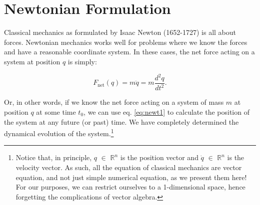 \documentclass[
  9pt,
]{extbook}
\theoremstyle{definition}
\theoremstyle{definition}
\theoremstyle{definition}
\theoremstyle{remark}
\begin{document}
\hypertarget{newtonian-formulation}{%
\section{Newtonian Formulation}\label{newtonian-formulation}}

Classical mechanics as formulated by Isaac Newton (1652-1727) is all about forces. Newtonian mechanics works well for problems where we know the forces and have a reasonable coordinate system. In these cases, the net force acting on a system at position \(q\) is simply:

\begin{equation}
F_{\mathrm{net}}(q) = m\ddot{q} = m \frac{d^2 q}{dt^2}.
\label{eq:newt1}
\end{equation}

Or, in other words, if we know the net force acting on a system of mass \(m\) at position \(q\) at some time \(t_0\), we can use eq. \eqref{eq:newt1} to calculate the position of the system at any future (or past) time. We have completely determined the dynamical evolution of the system.\footnote{Notice that, in principle, \(q\) \(\in\) \(\mathbb{R}^{n}\) is the position vector and \(\dot{q}\) \(\in\) \(\mathbb{R}^{n}\) is the velocity vector. As such, all the equation of classical mechanics are vector equation, and not just simple numerical equation, as we present them here! For our purposes, we can restrict ourselves to a 1-dimensional space, hence forgetting the complications of vector algebra.}
\end{document}
